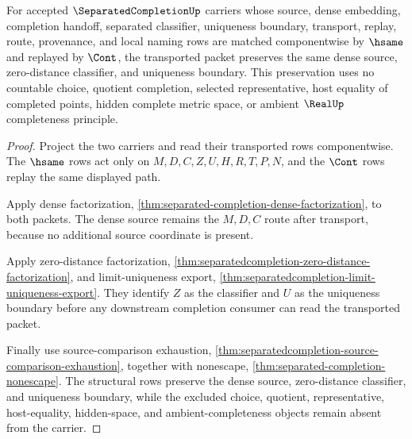 \begin{theorem}
\label{thm:separatedcompletion-choice-free-limit-transport}
For accepted $\SeparatedCompletionUp$ carriers whose source, dense embedding, completion handoff, separated classifier, uniqueness boundary, transport, replay, route, provenance, and local naming rows are matched componentwise by $\hsame$ and replayed by $\Cont$, the transported packet preserves the same dense source, zero-distance classifier, and uniqueness boundary. This preservation uses no countable choice, quotient completion, selected representative, host equality of completed points, hidden complete metric space, or ambient $\RealUp$ completeness principle.
\end{theorem}
\begin{proof}
Project the two carriers and read their transported rows componentwise. The $\hsame$ rows act only on $M,D,C,Z,U,H,R,T,P,N$, and the $\Cont$ rows replay the same displayed path.

Apply dense factorization, \autoref{thm:separated-completion-dense-factorization}, to both packets. The dense source remains the $M,D,C$ route after transport, because no additional source coordinate is present.

Apply zero-distance factorization, \autoref{thm:separatedcompletion-zero-distance-factorization}, and limit-uniqueness export, \autoref{thm:separatedcompletion-limit-uniqueness-export}. They identify $Z$ as the classifier and $U$ as the uniqueness boundary before any downstream completion consumer can read the transported packet.

Finally use source-comparison exhaustion, \autoref{thm:separatedcompletion-source-comparison-exhaustion}, together with nonescape, \autoref{thm:separated-completion-nonescape}. The structural rows preserve the dense source, zero-distance classifier, and uniqueness boundary, while the excluded choice, quotient, representative, host-equality, hidden-space, and ambient-completeness objects remain absent from the carrier.
\end{proof}

